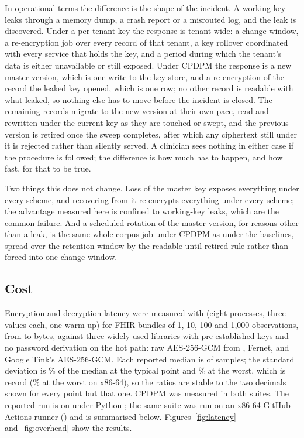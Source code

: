 In operational terms the difference is the shape of the incident. A working key leaks through a memory dump, a crash report or a misrouted log, and the leak is discovered. Under a per-tenant key the response is tenant-wide: a change window, a re-encryption job over every record of that tenant, a key rollover coordinated with every service that holds the key, and a period during which the tenant's data is either unavailable or still exposed. Under CPDPM the response is a new master version, which is one write to the key store, and a re-encryption of the record the leaked key opened, which is one row; no other record is readable with what leaked, so nothing else has to move before the incident is closed. The remaining records migrate to the new version at their own pace, read and rewritten under the current key as they are touched or swept, and the previous version is retired once the sweep completes, after which any ciphertext still under it is rejected rather than silently served. A clinician sees nothing in either case if the procedure is followed; the difference is how much has to happen, and how fast, for that to be true.

Two things this does not change. Loss of the master key exposes everything under every scheme, and recovering from it re-encrypts everything under every scheme; the advantage measured here is confined to working-key leaks, which are the common failure. And a scheduled rotation of the master version, for reasons other than a leak, is the same whole-corpus job under CPDPM as under the baselines, spread over the retention window by the readable-until-retired rule rather than forced into one change window.

\subsection{Cost}
\label{sec:cost}

Encryption and decryption latency were measured with  (eight processes, three values each, one warm-up) for FHIR bundles of 1, 10, 100 and 1{,}000 observations, from \BytesOne{} to \BytesThousand{} bytes, against three widely used libraries with pre-established keys and no password derivation on the hot path: raw AES-256-GCM from , Fernet, and Google Tink's AES-256-GCM. Each reported median is of \BenchValues{} samples; the standard deviation is \BenchMedianCv\% of the median at the typical point and \BenchMaxCv\% at the worst, which is \BenchMaxCvWhere{} record (\XBenchMaxCv\% at the worst on x86-64), so the ratios are stable to the two decimals shown for every point but that one. CPDPM was measured in both suites. The reported run is on \BenchPlatform{} under Python \BenchPython; the same suite was run on an x86-64 GitHub Actions runner (\XCpu) and is summarised below. Figures~\ref{fig:latency} and~\ref{fig:overhead} show the results.

